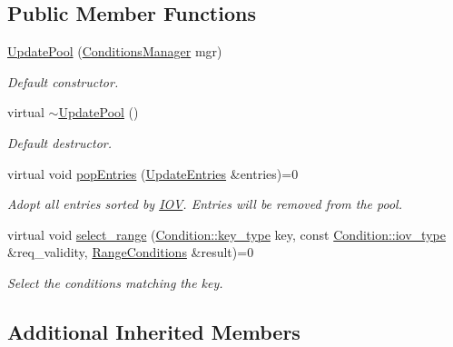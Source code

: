 \subsection*{Public Member Functions}
\begin{DoxyCompactItemize}
\item 
\hyperlink{class_d_d4hep_1_1_conditions_1_1_update_pool_a906a53034c9d5f71194f1f0e0e0a82d2}{Update\+Pool} (\hyperlink{class_d_d4hep_1_1_conditions_1_1_conditions_manager}{Conditions\+Manager} mgr)
\begin{DoxyCompactList}\small\item\em Default constructor. \end{DoxyCompactList}\item 
virtual \hyperlink{class_d_d4hep_1_1_conditions_1_1_update_pool_a6f6e54abf8c2d19be9166686fcd51215}{$\sim$\+Update\+Pool} ()
\begin{DoxyCompactList}\small\item\em Default destructor. \end{DoxyCompactList}\item 
virtual void \hyperlink{class_d_d4hep_1_1_conditions_1_1_update_pool_aeb7494e79ae47538aa4f6ca2cb7c4b4d}{pop\+Entries} (\hyperlink{class_d_d4hep_1_1_conditions_1_1_update_pool_a1a578a7a025ded412da474be106dc780}{Update\+Entries} \&entries)=0
\begin{DoxyCompactList}\small\item\em Adopt all entries sorted by \hyperlink{class_d_d4hep_1_1_i_o_v}{I\+OV}. Entries will be removed from the pool. \end{DoxyCompactList}\item 
virtual void \hyperlink{class_d_d4hep_1_1_conditions_1_1_update_pool_a3cd5432ff682a8da5c9402814a1bd995}{select\+\_\+range} (\hyperlink{class_d_d4hep_1_1_conditions_1_1_condition_a7528efa762e8cc072ef80ea67c3531f9}{Condition\+::key\+\_\+type} key, const \hyperlink{class_d_d4hep_1_1_conditions_1_1_condition_ad84300e226b2085ec5e9db7f47be5539}{Condition\+::iov\+\_\+type} \&req\+\_\+validity, \hyperlink{namespace_d_d4hep_1_1_conditions_ae765f0140a33973a430280f02b6062f4}{Range\+Conditions} \&result)=0
\begin{DoxyCompactList}\small\item\em Select the conditions matching the key. \end{DoxyCompactList}\end{DoxyCompactItemize}
\subsection*{Additional Inherited Members}


